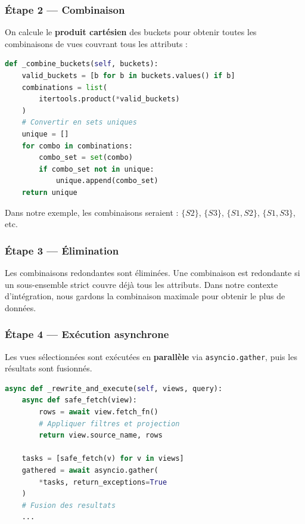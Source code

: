 \documentclass[12pt,a4paper]{article}
\begin{document}
\subsubsection{Étape 2 — Combinaison}
On calcule le \textbf{produit cartésien} des buckets pour obtenir toutes les combinaisons de vues couvrant tous les attributs :

\begin{lstlisting}[language=Python, caption=Combinaison des Buckets]
def _combine_buckets(self, buckets):
    valid_buckets = [b for b in buckets.values() if b]
    combinations = list(
        itertools.product(*valid_buckets)
    )
    # Convertir en sets uniques
    unique = []
    for combo in combinations:
        combo_set = set(combo)
        if combo_set not in unique:
            unique.append(combo_set)
    return unique
\end{lstlisting}

Dans notre exemple, les combinaisons seraient : $\{S2\}$, $\{S3\}$, $\{S1, S2\}$, $\{S1, S3\}$, etc.

\subsubsection{Étape 3 — Élimination}
Les combinaisons redondantes sont éliminées. Une combinaison est redondante si un sous-ensemble strict couvre déjà tous les attributs. Dans notre contexte d'intégration, nous gardons la combinaison maximale pour obtenir le plus de données.

\subsubsection{Étape 4 — Exécution asynchrone}
Les vues sélectionnées sont exécutées en \textbf{parallèle} via \texttt{asyncio.gather}, puis les résultats sont fusionnés.

\begin{lstlisting}[language=Python, caption=Exécution parallèle]
async def _rewrite_and_execute(self, views, query):
    async def safe_fetch(view):
        rows = await view.fetch_fn()
        # Appliquer filtres et projection
        return view.source_name, rows

    tasks = [safe_fetch(v) for v in views]
    gathered = await asyncio.gather(
        *tasks, return_exceptions=True
    )
    # Fusion des resultats
    ...
\end{lstlisting}

\end{document}
